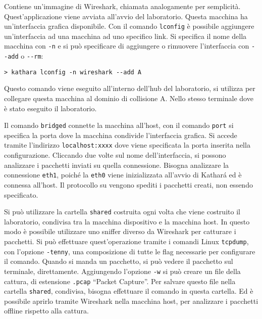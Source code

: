 \documentclass{article}
\numberwithin{equation}{subsection}
\begin{document}
Contiene un'immagine di Wireshark, chiamata analogamente per semplicità. Quest'applicazione viene avviata all'avvio del laboratorio. Questa macchina ha un'interfaccia grafica 
disponibile. Con il comando \verb|lconfig| è possibile aggiungere un'interfaccia ad una macchina ad uno specifico link. Si specifica il nome della macchina con \verb|-n| e 
si può specificare di aggiungere o rimuovere l'interfaccia con \verb|--add| o \verb|--rm|:
\begin{verbatim}
> kathara lconfig -n wireshark --add A
\end{verbatim}
Questo comando viene eseguito all'interno dell'hub del laboratorio, si utilizza per collegare questa macchina al dominio di collisione A. Nello stesso terminale dove 
è stato eseguito il laboratorio. 


Il comando \verb|bridged| connette la macchina all'host, con il comando \verb|port| si specifica la porta dove la macchina condivide l'interfaccia grafica. Si 
accede tramite l'indirizzo \verb|localhost:xxxx| dove viene specificata la porta inserita nella configurazione. 
Cliccando due volte sul nome dell'interfaccia, si possono analizzare i pacchetti inviati su quella connessione. Bisogna analizzare la connessione \verb|eth1|, poiché la 
\verb|eth0| viene inizializzata all'avvio di Kathar\'{a} ed è connessa all'host. 
Il protocollo su vengono spediti i pacchetti creati, non essendo specificato. 


Si può utilizzare la cartella \verb|shared| costruita ogni volta che viene costruito il laboratorio, condivisa tra la macchina dispositivo e la macchina host. In 
questo modo è possibile utilizzare uno sniffer diverso da Wireshark per catturare i pacchetti. Si può effettuare quest'operazione tramite i comandi Linux \verb|tcpdump|, 
con l'opzione \verb|-tenny|, una composizione di tutte le flag necessarie per configurare il comando. Quando si manda un pacchetto, si può vedere il pacchetto sul terminale, 
direttamente. Aggiungendo l'opzione \verb|-w| si può creare un file della cattura, di estensione \verb|.pcap| ``Packet Capture''. Per salvare questo file nella cartella 
\verb|shared|, condivisa, bisogna effettuare il comando in questa cartella. Ed è possibile aprirlo tramite Wireshark nella macchina host, per analizzare i pacchetti 
offline rispetto alla cattura. 





\clearpage
\end{document}
